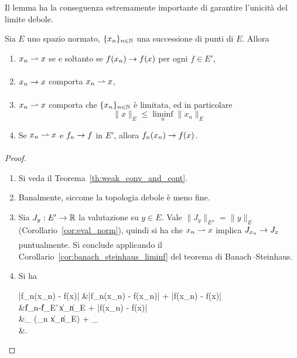 \begin{remark}
	Il lemma ha la conseguenza estremamente importante di garantire l'unicità del limite debole.
\end{remark}

\begin{lemma}
\label{lemma:weaktop_five}
	Sia $E$ uno spazio normato, $\{x_n\}_{n \in \mathbb{N}}$ una successione di punti di $E$. Allora
	\begin{enumerate}
		\item $x_n \rightharpoonup x$ se e soltanto se $f(x_n) \underset{{}}{\rightarrow} f(x)$ per ogni $f \in E'$,
		\item $x_n \underset{{}}{\rightarrow} x$ comporta $x_n \rightharpoonup x$,
		\item $x_n \rightharpoonup x$ comporta che $\{x_n\}_{n \in \mathbb{N}}$ è limitata, ed in particolare
		\begin{equation*}
			\|x\|_E \leq \liminf_n \|x_n\|_E
		\end{equation*}
		\item Se $x_n \rightharpoonup x$ e $f_n \underset{{}}{\rightarrow} f$ in $E'$, allora $f_n(x_n) \underset{{}}{\rightarrow} f(x)$.
	\end{enumerate}
\end{lemma}
\begin{proof}
	\leavevmode
	\begin{enumerate}
		\item Si veda il Teorema~\ref{th:weak_conv_and_cont}.
		\item Banalmente, siccome la topologia debole è meno fine.
		\item Sia $J_y : E' \to \mathbb{R}$ la valutazione su $y \in E$. Vale $\|J_y\|_{E''} = \|y\|_E$ (Corollario~\ref{cor:eval_norm}), quindi si ha che $x_n \rightharpoonup x$ implica $J_{x_n} \underset{{}}{\rightarrow} J_x$ puntualmente. Si conclude applicando il Corollario~\ref{cor:banach_steinhaus_liminf} del teorema di Banach--Steinhaus.
		\item Si ha
		\begin{eqalign*}
			|f_n(x_n) - f(x)| &\leq |f_n(x_n) - f(x_n)| + |f(x_n) - f(x)|\\
			&\leq \|f_n-f\|_{E'}\,\|x_n\|_E + |f(x_n) - f(x)|\\
			&\leq {}_{} (\liminf_n \|x_n\|_E) + _{}\\[-1.5ex]
			&.\\[-1ex]
		\end{eqalign*}
	\end{enumerate}
\end{proof}

